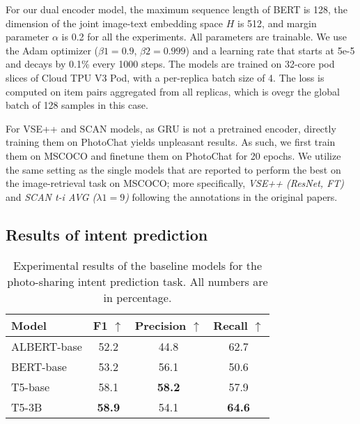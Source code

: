 \documentclass[11pt,a4paper]{article}
\begin{document}
For our dual encoder model, the maximum sequence length of BERT is 128, the dimension of the joint image-text embedding space $H$ is 512, and margin parameter $\alpha$ is 0.2 for all the experiments. All parameters are trainable. We use the Adam optimizer ($\beta1 = 0.9$, $\beta2 = 0.999$) and a learning rate
that starts at 5e-5 and decays by 0.1\% every 1000
steps. 
The models are trained on 32-core pod slices of Cloud TPU V3 Pod, with a per-replica batch size of 4. The loss is computed on item pairs
aggregated from all replicas, which is ovegr the
global batch of 128 samples in this case.

For VSE++ and SCAN models, as GRU is not a pretrained encoder, directly training them on PhotoChat yields unpleasant results. As such, we first train them on MSCOCO and finetune them on PhotoChat for 20 epochs. We utilize the same setting as the single models that are reported to perform the best on the image-retrieval task on MSCOCO; more specifically, \textit{VSE++ (ResNet, FT)} and \textit{SCAN t-i AVG ($\lambda1 = 9$)} following the annotations in the original papers. 







\subsection{Results of intent prediction}

\begin{table}[t]
\caption{Experimental results of the baseline models for the photo-sharing intent prediction task. All numbers are in percentage.} \label{tab:class_results}
\vspace{-2mm}
\centering
\small
\begin{tabular}{l|c|c|c}
\hline
{\textbf{Model}} & \textbf{F1} $\uparrow$ & \textbf{Precision} $\uparrow$ & \textbf{Recall} $\uparrow$ \\ \hline
ALBERT-base & 52.2 & 44.8 & 62.7 \\ \hline
BERT-base & 53.2 & 56.1 & 50.6 \\ \hline
T5-base & 58.1 & \textbf{58.2} & 57.9 \\ \hline
T5-3B & \textbf{58.9} & 54.1 & \textbf{64.6} \\ \hline
\end{tabular}
\vspace{-2mm}
\end{table}
\end{document}
